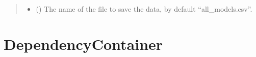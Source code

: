 \documentclass[letterpaper,10pt,english]{sphinxmanual}
\begin{document}
\begin{fulllineitems}
\begin{fulllineitems}
\begin{quote}
\begin{description}
\begin{itemize}
\item {} 
\sphinxAtStartPar
{} (\sphinxstyleliteralemphasis{\sphinxupquote{, }}) \textendash{} The name of the file to save the data, by default “all\_models.csv”.

\end{itemize}

\end{description}\end{quote}

\end{fulllineitems}


\end{fulllineitems}



\section{DependencyContainer}
\label{\detokenize{modules:module-DependencyContainer}}\label{\detokenize{modules:dependencycontainer}}
\end{document}
